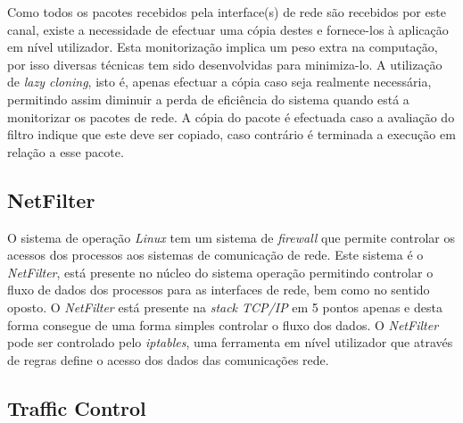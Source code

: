Como todos os pacotes recebidos pela interface(s) de rede são recebidos por este canal, existe a necessidade de efectuar uma cópia destes e fornece-los à aplicação em nível utilizador.
Esta monitorização implica um peso extra na computação, por isso diversas técnicas tem sido desenvolvidas para minimiza-lo.
A utilização de \textit{lazy cloning}, isto é, apenas efectuar a cópia caso seja realmente necessária, permitindo assim diminuir a perda de eficiência do sistema quando está a monitorizar os pacotes de rede.
A cópia do pacote é efectuada caso a avaliação do filtro indique que este deve ser copiado, caso contrário é terminada a execução em relação a esse pacote.



\subsection{NetFilter}

O sistema de operação \textit{Linux} tem um sistema de \textit{firewall} que permite controlar os acessos dos processos aos sistemas de comunicação de rede.
 Este sistema é o \textit{NetFilter}, está presente no núcleo do sistema operação permitindo controlar o fluxo de dados dos processos para as interfaces de rede, bem como no sentido oposto.
 O \textit{NetFilter} está presente na \textit{stack TCP/IP} em 5 pontos apenas e desta forma consegue de uma forma simples controlar o fluxo dos dados.
 O \textit{NetFilter} pode ser controlado pelo \textit{iptables}, uma ferramenta em nível utilizador que através de regras define o acesso dos dados das comunicações rede.

\subsection{Traffic Control}

